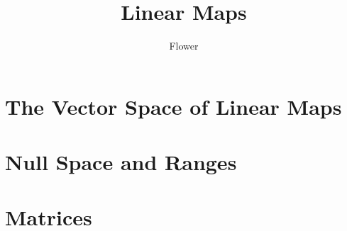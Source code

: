 \documentclass[
	12pt, %
]{fphw}
\title{Linear Maps} %
\author{Flower} %
\date{} %
\institute{University of Mars \\ Institute of Intergalactic Travel} %
\begin{document}
\maketitle %


\section{The Vector Space of Linear Maps}










\section{Null Space and Ranges}



\section{Matrices}

\end{document}

